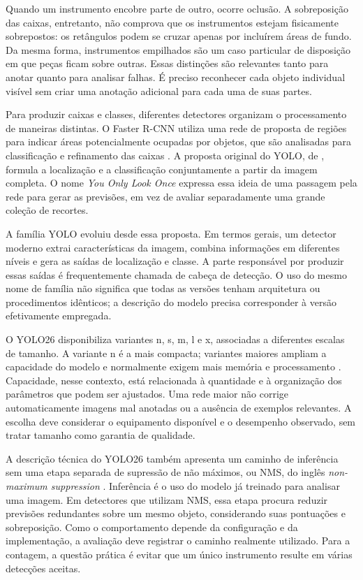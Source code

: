 Quando um instrumento encobre parte de outro, ocorre oclusão. A sobreposição das caixas, entretanto, não comprova que os instrumentos estejam fisicamente sobrepostos: os retângulos podem se cruzar apenas por incluírem áreas de fundo. Da mesma forma, instrumentos empilhados são um caso particular de disposição em que peças ficam sobre outras. Essas distinções são relevantes tanto para anotar quanto para analisar falhas. É preciso reconhecer cada objeto individual visível sem criar uma anotação adicional para cada uma de suas partes.

Para produzir caixas e classes, diferentes detectores organizam o processamento de maneiras distintas. O Faster R-CNN utiliza uma rede de proposta de regiões para indicar áreas potencialmente ocupadas por objetos, que são analisadas para classificação e refinamento das caixas \parencite{ren2015faster}. A proposta original do YOLO, de \textcite{redmon2016}, formula a localização e a classificação conjuntamente a partir da imagem completa. O nome \textit{You Only Look Once} expressa essa ideia de uma passagem pela rede para gerar as previsões, em vez de avaliar separadamente uma grande coleção de recortes.

A família YOLO evoluiu desde essa proposta. Em termos gerais, um detector moderno extrai características da imagem, combina informações em diferentes níveis e gera as saídas de localização e classe. A parte responsável por produzir essas saídas é frequentemente chamada de cabeça de detecção. O uso do mesmo nome de família não significa que todas as versões tenham arquitetura ou procedimentos idênticos; a descrição do modelo precisa corresponder à versão efetivamente empregada.

O YOLO26 disponibiliza variantes n, s, m, l e x, associadas a diferentes escalas de tamanho. A variante n é a mais compacta; variantes maiores ampliam a capacidade do modelo e normalmente exigem mais memória e processamento \parencite{ultralyticsYOLO26intro}. Capacidade, nesse contexto, está relacionada à quantidade e à organização dos parâmetros que podem ser ajustados. Uma rede maior não corrige automaticamente imagens mal anotadas ou a ausência de exemplos relevantes. A escolha deve considerar o equipamento disponível e o desempenho observado, sem tratar tamanho como garantia de qualidade.

A descrição técnica do YOLO26 também apresenta um caminho de inferência sem uma etapa separada de supressão de não máximos, ou NMS, do inglês \textit{non-maximum suppression} \parencite{jocher2026}. Inferência é o uso do modelo já treinado para analisar uma imagem. Em detectores que utilizam NMS, essa etapa procura reduzir previsões redundantes sobre um mesmo objeto, considerando suas pontuações e sobreposição. Como o comportamento depende da configuração e da implementação, a avaliação deve registrar o caminho realmente utilizado. Para a contagem, a questão prática é evitar que um único instrumento resulte em várias detecções aceitas.

